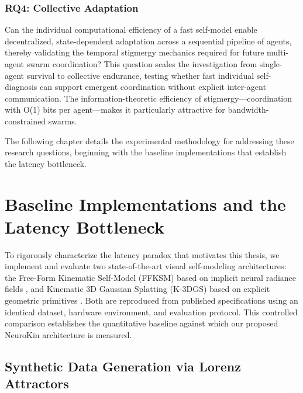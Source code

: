 \documentclass[12pt,a4paper,oneside]{report}
\begin{document}
\subsection{RQ4: Collective Adaptation}
\label{subsec:rq4_collective_adaptation}

Can the individual computational efficiency of a fast self-model enable decentralized, state-dependent adaptation across a sequential pipeline of agents, thereby validating the temporal stigmergy mechanics required for future multi-agent swarm coordination? This question scales the investigation from single-agent survival to collective endurance, testing whether fast individual self-diagnosis can support emergent coordination without explicit inter-agent communication. The information-theoretic efficiency of stigmergy—coordination with O(1) bits per agent—makes it particularly attractive for bandwidth-constrained swarms.

The following chapter details the experimental methodology for addressing these research questions, beginning with the baseline implementations that establish the latency bottleneck.

\clearpage

\chapter{Baseline Implementations and the Latency Bottleneck}
\label{chap:baseline_latency_bottleneck}

To rigorously characterize the latency paradox that motivates this thesis, we implement and evaluate two state-of-the-art visual self-modeling architectures: the Free-Form Kinematic Self-Model (FFKSM) based on implicit neural radiance fields \cite{hu2024teaching}, and Kinematic 3D Gaussian Splatting (K-3DGS) based on explicit geometric primitives \cite{hu2025learning}. Both are reproduced from published specifications using an identical dataset, hardware environment, and evaluation protocol. This controlled comparison establishes the quantitative baseline against which our proposed NeuroKin architecture is measured.

\section{Synthetic Data Generation via Lorenz Attractors}
\end{document}
